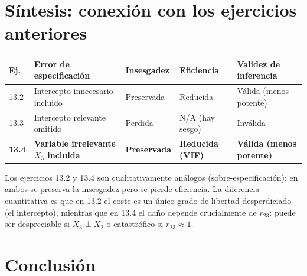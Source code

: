 \documentclass[12pt, letterpaper]{article}
\begin{document}
\section{Síntesis: conexión con los ejercicios anteriores}

\begin{center}
\renewcommand{\arraystretch}{1.4}
\small
\begin{tabular}{p{1.0cm}p{4.0cm}p{2.2cm}p{2.6cm}p{3.0cm}}
\toprule
\textbf{Ej.} & \textbf{Error de especificación} & \textbf{Insesgadez} & \textbf{Eficiencia} & \textbf{Validez de inferencia} \\
\midrule
13.2 & Intercepto innecesario incluido      & Preservada  & Reducida            & Válida (menos potente) \\
13.3 & Intercepto relevante omitido         & Perdida     & N/A (hay sesgo)     & Inválida \\
\textbf{13.4} & \textbf{Variable irrelevante $X_3$ incluida} & \textbf{Preservada} & \textbf{Reducida (VIF)} & \textbf{Válida (menos potente)} \\
\bottomrule
\end{tabular}
\end{center}

Los ejercicios 13.2 y 13.4 son cualitativamente análogos (sobre-especificación):
en ambos se preserva la insesgadez pero se pierde eficiencia. La diferencia
cuantitativa es que en 13.2 el coste es un único grado de libertad
desperdiciado (el intercepto), mientras que en 13.4 el daño depende
crucialmente de $r_{23}$: puede ser despreciable si $X_3 \perp X_2$ o
catastrófico si $r_{23} \approx 1$.

\section{Conclusión}
\end{document}
